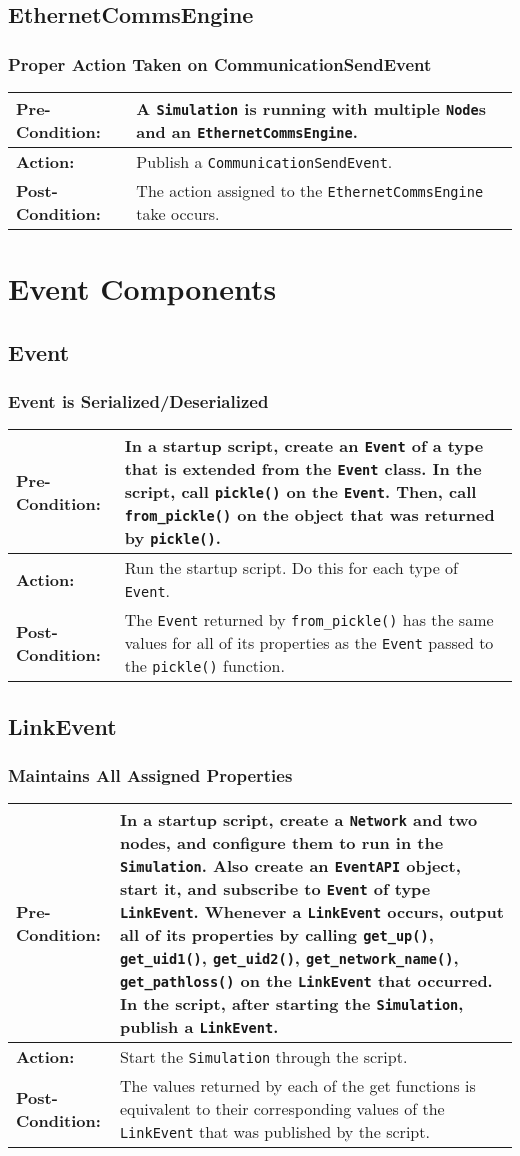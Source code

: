 \documentclass[titlepage]{article}
\newcommand{\testcase}[3]{
    \begin{center}
    \begin{tabular}{| l | p{0.7\textwidth}|}
        \hline
        \rowcolor[gray]{0.8}\textbf{Pre-Condition:} & #1 \\ \hline
        \textbf{Action:} & #2 \\ \hline
        \rowcolor[gray]{0.8}\textbf{Post-Condition:} & #3 \\ \hline
    \end{tabular}
    \end{center}
}
\begin{document}
\subsection{EthernetCommsEngine}
\subsubsection{Proper Action Taken on CommunicationSendEvent}
\testcase{A \texttt{Simulation} is running with multiple \texttt{Node}s and an \texttt{EthernetCommsEngine}.}{Publish a \texttt{CommunicationSendEvent}.}{The action assigned to the \texttt{EthernetCommsEngine} take occurs.}

\section{Event Components}
\subsection{Event}
\subsubsection{Event is Serialized/Deserialized}
\testcase{In a startup script, create an \texttt{Event} of a type that is extended from the \texttt{Event} class. In the script, call \texttt{pickle()} on the \texttt{Event}. Then, call \texttt{from\_pickle()} on the object that was returned by \texttt{pickle()}.}{Run the startup script. Do this for each type of \texttt{Event}.}{The \texttt{Event} returned by \texttt{from\_pickle()} has the same values for all of its properties as the \texttt{Event} passed to the \texttt{pickle()} function.}

\subsection{LinkEvent}
\subsubsection{Maintains All Assigned Properties}
\testcase{In a startup script, create a \texttt{Network} and two nodes, and configure them to run in the \texttt{Simulation}. Also create an \texttt{EventAPI} object, start it, and subscribe to \texttt{Event} of type \texttt{LinkEvent}. Whenever a \texttt{LinkEvent} occurs, output all of its properties by calling \texttt{get\_up()}, \texttt{get\_uid1()}, \texttt{get\_uid2()}, \texttt{get\_network\_name()}, \texttt{get\_pathloss()} on the \texttt{LinkEvent} that occurred. In the script, after starting the \texttt{Simulation}, publish a \texttt{LinkEvent}.}{Start the \texttt{Simulation} through the script.}{The values returned by each of the get functions is equivalent to their corresponding values of the \texttt{LinkEvent} that was published by the script.}
\end{document}

